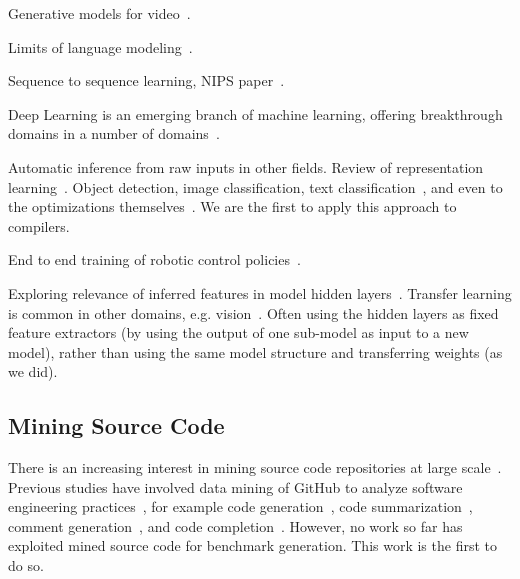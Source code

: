 Generative models for video~\cite{Srivastava2015}.

Limits of language modeling~\cite{Jozefowicz2016a}.

Sequence to sequence learning, NIPS paper~\cite{Sutskever2014}.

Deep Learning is an emerging branch of machine learning, offering breakthrough domains in a number of domains~\cite{Wang2017}.

Automatic inference from raw inputs in other fields. Review of representation learning~\cite{Bengio2013}. Object detection, image classification, text classification~\cite{Conneau2016}, and even to the optimizations themselves~\cite{Andrychowicz2016a}. We are the first to apply this approach to compilers.

End to end training of robotic control policies~\cite{Levine2016}.




Exploring relevance of inferred features in model hidden layers~\cite{Yosinski2014}. Transfer learning is common in other domains, e.g. vision~\cite{Razavian2014,Oquab2014}. Often using the hidden layers as fixed feature extractors (by using the output of one sub-model as input to a new model), rather than using the same model structure and transferring weights (as we did).


\subsection{Mining Source Code}

There is an increasing interest in mining source code repositories at large scale~\cite{Allamanis2013a,White2015a,Bird2009}. Previous studies have involved data mining of GitHub to analyze software engineering practices~\cite{Wu2014,Guzman2014,Baishakhi2014a,Vasilescu2015}, for example code generation~\cite{Zhang2015a}, code summarization~\cite{Allamanis2016}, comment generation~\cite{Wong2013}, and code completion~\cite{Raychev2014}. However, no work so far has exploited mined source code for benchmark generation. This work is the first to do so.

